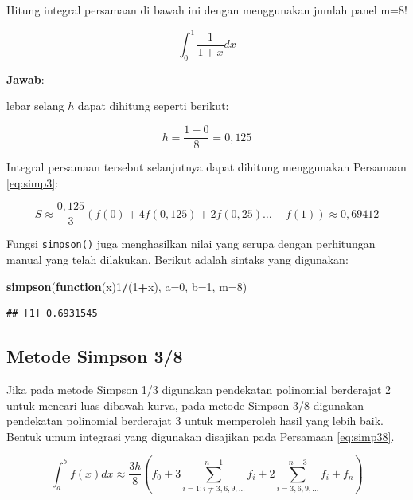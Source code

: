 \documentclass[]{book}
\newenvironment{Shaded}{\begin{snugshade}}{\end{snugshade}}
\newcommand{\ControlFlowTok}[1]{\textcolor[rgb]{0.13,0.29,0.53}{\textbf{#1}}}
\newcommand{\DataTypeTok}[1]{\textcolor[rgb]{0.13,0.29,0.53}{#1}}
\newcommand{\DecValTok}[1]{\textcolor[rgb]{0.00,0.00,0.81}{#1}}
\newcommand{\KeywordTok}[1]{\textcolor[rgb]{0.13,0.29,0.53}{\textbf{#1}}}
\newcommand{\NormalTok}[1]{#1}
\newcommand{\OperatorTok}[1]{\textcolor[rgb]{0.81,0.36,0.00}{\textbf{#1}}}
\theoremstyle{definition}
\theoremstyle{definition}
\theoremstyle{definition}
\theoremstyle{remark}
\let\BeginKnitrBlock\begin \let\EndKnitrBlock\end
\begin{document}
\BeginKnitrBlock{example}
\protect\hypertarget{exm:simpexm}{}{\label{exm:simpexm} }Hitung integral persamaan di bawah ini dengan menggunakan jumlah panel m=8!
\EndKnitrBlock{example}

\[
\int_{0}^1 \frac{1}{1+x}dx
\]

\textbf{Jawab}:

lebar selang \(h\) dapat dihitung seperti berikut:

\[
h = \frac{1-0}{8}=0,125
\]

Integral persamaan tersebut selanjutnya dapat dihitung menggunakan Persamaan \eqref{eq:simp3}:

\[
S\approx\frac{0,125}{3}\left(f\left(0\right)+4f\left(0,125\right)+2f\left(0,25\right)\dots+f\left(1\right)\right)\approx 0,69412
\]

Fungsi \texttt{simpson()} juga menghasilkan nilai yang serupa dengan perhitungan manual yang telah dilakukan. Berikut adalah sintaks yang digunakan:

\begin{Shaded}
\begin{Highlighting}[]
\KeywordTok{simpson}\NormalTok{(}\ControlFlowTok{function}\NormalTok{(x)}\DecValTok{1}\OperatorTok{/}\NormalTok{(}\DecValTok{1}\OperatorTok{+}\NormalTok{x), }\DataTypeTok{a=}\DecValTok{0}\NormalTok{, }\DataTypeTok{b=}\DecValTok{1}\NormalTok{, }\DataTypeTok{m=}\DecValTok{8}\NormalTok{)}
\end{Highlighting}
\end{Shaded}

\begin{verbatim}
## [1] 0.6931545
\end{verbatim}

\hypertarget{simpson38}{%
\subsection{Metode Simpson 3/8}\label{simpson38}}

Jika pada metode Simpson 1/3 digunakan pendekatan polinomial berderajat 2 untuk mencari luas dibawah kurva, pada metode Simpson 3/8 digunakan pendekatan polinomial berderajat 3 untuk memperoleh hasil yang lebih baik. Bentuk umum integrasi yang digunakan disajikan pada Persamaan \eqref{eq:simp38}.

\begin{equation}
\int_a^bf\left(x\right)dx\approx\frac{3h}{8}\left(f_0+3\sum_{i=1;i\ne3,6,9,\dots}^{n-1}f_i+2\sum_{i=3,6,9,\dots}^{n-3}f_i+f_n\right)
  \label{eq:simp38}
\end{equation}
\end{document}
